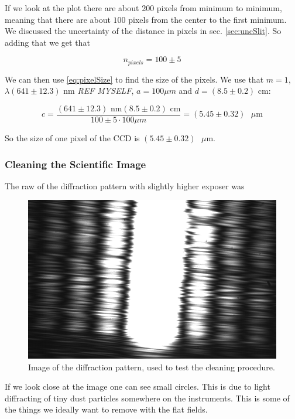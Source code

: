 \documentclass{emulateapj}
\begin{document}
If we look at the plot there are about 200 pixels from minimum to minimum, meaning that there are about $100$ pixels from the center to the first minimum. We discussed the uncertainty of the distance in pixels in sec. \ref{sec:uncSlit}. So adding that we get that

\begin{equation}
n_{pixels} = 100\pm 5
\end{equation}

We can then use \eqref{eq:pixelSize} to find the size of the pixels. We use that $m = 1$, $\lambda (641 \pm 12.3)$ nm \emph{REF MYSELF}, $a = 100 \mu m$ and $d = (8.5 \pm 0.2)$ cm:

\begin{equation}
c =  \frac{(641 \pm 12.3) \text{ nm} (8.5 \pm 0.2) \text{ cm}}{100\pm 5 \cdot100 \mu m} = (5.45 \pm 0.32)\text{ }\mu\text{m}
\end{equation}

So the size of one pixel of the CCD is $(5.45 \pm 0.32)\text{ }\mu\text{m}$.


\subsubsection{Cleaning the Scientific Image}

The raw of the diffraction pattern with slightly higher exposer was

\begin{figure}[H]
\centering
\includegraphics[scale=0.2]{3_2.png}
\caption{Image of the diffraction pattern, used to test the cleaning procedure.}
\label{img:rawClean}
\end{figure}

If we look close at the image one can see small circles. This is due to light diffracting of tiny dust particles somewhere on the instruments. This is some of the things we ideally want to remove with the flat fields.
\end{document}
